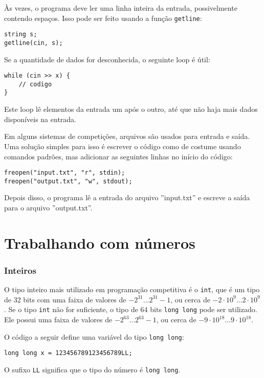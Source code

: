 Às vezes, o programa deve ler uma linha inteira da entrada, possivelmente contendo espaços. Isso pode ser feito usando a função \texttt{getline}:

\begin{lstlisting}
string s;
getline(cin, s);
\end{lstlisting}

Se a quantidade de dados for desconhecida, o seguinte loop é útil:
\begin{lstlisting}
while (cin >> x) {
    // codigo
}
\end{lstlisting}
Este loop lê elementos da entrada um após o outro, até que não haja mais dados disponíveis na entrada.

Em alguns sistemas de competições, arquivos são usados para entrada e saída. Uma solução simples para isso é escrever o código como de costume usando comandos padrões, mas adicionar as seguintes linhas no início do código:
\begin{lstlisting}
freopen("input.txt", "r", stdin);
freopen("output.txt", "w", stdout);
\end{lstlisting}
Depois disso, o programa lê a entrada do arquivo ''input.txt'' e escreve a saída para o arquivo ''output.txt''.

\section{Trabalhando com números}


\subsubsection{Inteiros}

O tipo inteiro mais utilizado em programação competitiva é o \texttt{int}, que é um tipo de 32 bits com uma faixa de valores de $-2^{31} \ldots 2^{31}-1$, ou cerca de $-2 \cdot 10^9 \ldots 2 \cdot 10^9$. Se o tipo \texttt{int} não for suficiente, o tipo de 64 bits \texttt{long long} pode ser utilizado. Ele possui uma faixa de valores de $-2^{63} \ldots 2^{63}-1$, ou cerca de $-9 \cdot 10^{18} \ldots 9 \cdot 10^{18}$.

O código a seguir define uma variável do tipo \texttt{long long}:
\begin{lstlisting}
long long x = 123456789123456789LL;
\end{lstlisting}
O sufixo \texttt{LL} significa que o tipo do número é \texttt{long long}.

